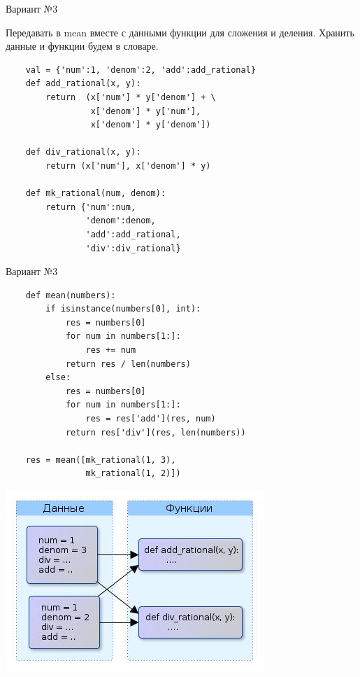 \documentclass{article}
\begin{document}
\begin{center} Вариант №3 \end{center}
Передавать в mean вместе с данными функции для сложения и деления.
Хранить данные и функции будем в словаре.

\begin{lstlisting}
    val = {'num':1, 'denom':2, 'add':add_rational}
    def add_rational(x, y):
        return  (x['num'] * y['denom'] + \
                 x['denom'] * y['num'], 
                 x['denom'] * y['denom'])

    def div_rational(x, y):
        return (x['num'], x['denom'] * y)

    def mk_rational(num, denom):
        return {'num':num, 
                'denom':denom, 
                'add':add_rational, 
                'div':div_rational}
\end{lstlisting}
\newpage

\begin{center} Вариант №3 \end{center}
\begin{lstlisting}
    def mean(numbers):
        if isinstance(numbers[0], int):
            res = numbers[0]
            for num in numbers[1:]:
                res += num
            return res / len(numbers)
        else:
            res = numbers[0]
            for num in numbers[1:]:
                res = res['add'](res, num)
            return res['div'](res, len(numbers))

    res = mean([mk_rational(1, 3), 
                mk_rational(1, 2)])
\end{lstlisting}
\newpage

\begin{center} \includegraphics{images/semi_OOP_style.jpg} \end{center} 
\newpage
\end{document}
